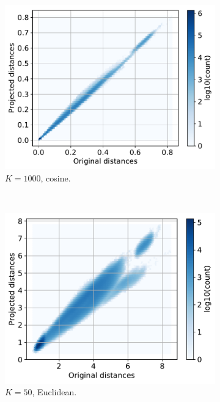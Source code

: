 \documentclass[11pt,onecolumn]{article}
\begin{document}
\begin{figure}[h!]
\begin{subfigure}[t]{0.29\textwidth}
				\centering
				\includegraphics[width=\linewidth]{fig/streamhash_projection_cosine_k1000.pdf}
				\caption{$K=1000$, cosine.}
		\end{subfigure}\\
		\begin{subfigure}[t]{0.29\textwidth}
				\centering
				\includegraphics[width=\linewidth]{fig/streamhash_projection_euclidean_k50.pdf}
				\caption{$K=50$, Euclidean.}
		\end{subfigure}
		\hfill
		\begin{subfigure}[t]{0.29\textwidth}
				\centering

\end{subfigure}
\end{figure}
\end{document}
